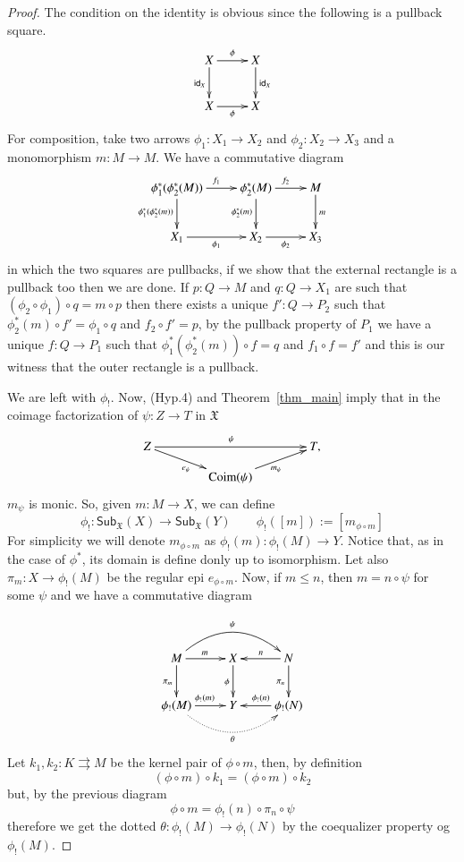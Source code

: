 \documentclass[12pt]{article}
\theoremstyle{definition}
\def\X{\mathfrak X}
\def\Coim{\mathrm{Coim}}
\numberwithin{equation}{section}
\newcommand{\catname}[1]{\mathbf{#1}}
\newcommand{\sub}[1]{\mathsf{Sub}_{\catname{#1}}}
\newcommand{\id}[1]{\mathsf{id}_{#1}}
\begin{document}
\begin{proof} 
The condition on the identity is obvious since the following is a pullback square.
\[
\xymatrix{X\ar[r]^{\phi} \ar[d]_{\id{X}}& X\ar[d]^{\id{X}}\\
	X \ar[r]_{\phi}& X}
\]
For composition, take two arrows $\phi_1:X_1\rightarrow X_2$ and $\phi_2:X_2\rightarrow X_3$ and a monomorphism $m:M\rightarrow M$. We have a commutative diagram
\[
\xymatrix{\phi^*_1(\phi_2^*(M)) \ar[d]_{\phi_1^*(\phi_2^*(m))}\ar[r]^{f_1} &\phi_2^*(M) \ar[d]_{\phi_2^*(m)}\ar[r]^{f_2}& M\ar[d]^{m}\\
	X_1\ar[r]_{\phi_1} & X_2\ar[r]_{\phi_2} & X_3
}
\]
in which the two squares are pullbacks, if we show that the external rectangle is a pullback too then we are done. If $p:Q\rightarrow M$ and $q:Q\rightarrow X_1$ are such that $(\phi_2\circ \phi_1)\circ q=m\circ p$ then there exists a unique $f':Q\rightarrow P_2$ such that $\phi_2^*(m)\circ f'=\phi_1\circ q$ and $f_2\circ f'=p$, by the pullback property of $P_1$ we have a unique $f:Q\rightarrow P_1$ such that $\phi_1^*(\phi_2^*(m))\circ f=q$ and $f_1\circ f=f'$ and this is our witness that the outer rectangle is a pullback.

We are left with $\phi_!$. Now, (Hyp.4) and Theorem~\ref{thm_main} imply that in the coimage factorization of $\psi\colon Z\to T$ in $\X$
	\[
	\xymatrix@C=40pt@R=10pt{
		Z\ar[rd]_{e_\psi}\ar[rr]^\psi&&T,\\
		&\Coim(\psi)\ar[ur]_{m_\psi}
	}
	\]
 $m_\psi$ is monic. So, given $m\colon M\rightarrow X$, we can define
	\[
	\phi_!:\sub{\X}(X)\rightarrow\sub{\X}(Y)\qquad  \phi_!([m]):=[m_{\phi\circ m}]
	\] 
For simplicity we will denote $m_{\phi\circ m}$
 as $\phi_!(m):\phi_!(M)\rightarrow Y$.	 Notice that, as in the case of $\phi^*$, its domain is define donly up to isomorphism. Let also $\pi_m:X\rightarrow \phi_!(M)$ be the regular epi $e_{\phi\circ m}$. Now, if $m\leq n$, then $m=n\circ \psi$ for some $\psi$ and we have a commutative diagram
 
  \[
  \xymatrix{M \ar[d]_{\pi_m} \ar@/^0.75cm/[rr]^{\psi} \ar[r]^{m}& X\ar[d]_{\phi} & N\ar[l]_{n} \ar[d]_{\pi_n}\\
  	\phi_!(M)\ar@{.>}@/_0.75cm/[rr]_{\theta} \ar[r]^{\phi_!(m)} & Y & \phi_!(N) \ar[l]_{\phi_!(n)}
  } \]
Let $k_1, k_2:K\rightrightarrows M$ be the kernel pair of $\phi\circ m$, then, by definition
\[(\phi \circ m) \circ k_1=(\phi \circ m) \circ k_2\]
but, by the previous diagram
\[\phi \circ m= \phi_!(n)\circ \pi_n\circ \psi\]
therefore we get the dotted $\theta:\phi_!(M)\to \phi_!(N)$ by the coequalizer property og $\phi_!(M)$.


\end{proof}
\end{document}
